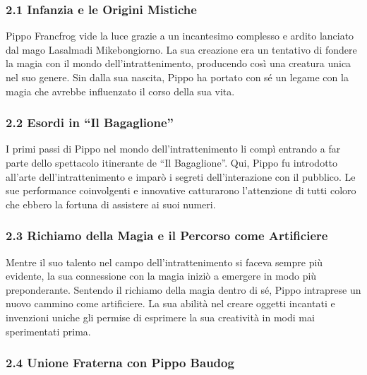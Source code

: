 \subsubsection{2.1 Infanzia e le Origini
Mistiche}\label{infanzia-e-le-origini-mistiche}

Pippo Francfrog vide la luce grazie a un incantesimo complesso e ardito
lanciato dal mago Lasalmadi Mikebongiorno. La sua creazione era un
tentativo di fondere la magia con il mondo dell'intrattenimento,
producendo così una creatura unica nel suo genere. Sin dalla sua
nascita, Pippo ha portato con sé un legame con la magia che avrebbe
influenzato il corso della sua vita.

\subsubsection{\texorpdfstring{2.2 \textbf{Esordi in ``Il
Bagaglione''}}{2.2 Esordi in ``Il Bagaglione''}}\label{esordi-in-il-bagaglione}

I primi passi di Pippo nel mondo dell'intrattenimento li compì entrando
a far parte dello spettacolo itinerante de ``Il Bagaglione''. Qui, Pippo
fu introdotto all'arte dell'intrattenimento e imparò i segreti
dell'interazione con il pubblico. Le sue performance coinvolgenti e
innovative catturarono l'attenzione di tutti coloro che ebbero la
fortuna di assistere ai suoi numeri.

\subsubsection{\texorpdfstring{2.3 \textbf{Richiamo della Magia e il
Percorso come
Artificiere}}{2.3 Richiamo della Magia e il Percorso come Artificiere}}\label{richiamo-della-magia-e-il-percorso-come-artificiere}

Mentre il suo talento nel campo dell'intrattenimento si faceva sempre
più evidente, la sua connessione con la magia iniziò a emergere in modo
più preponderante. Sentendo il richiamo della magia dentro di sé, Pippo
intraprese un nuovo cammino come artificiere. La sua abilità nel creare
oggetti incantati e invenzioni uniche gli permise di esprimere la sua
creatività in modi mai sperimentati prima.

\subsubsection{\texorpdfstring{2.4 \textbf{Unione Fraterna con Pippo
Baudog}}{2.4 Unione Fraterna con Pippo Baudog}}\label{unione-fraterna-con-pippo-baudog}

